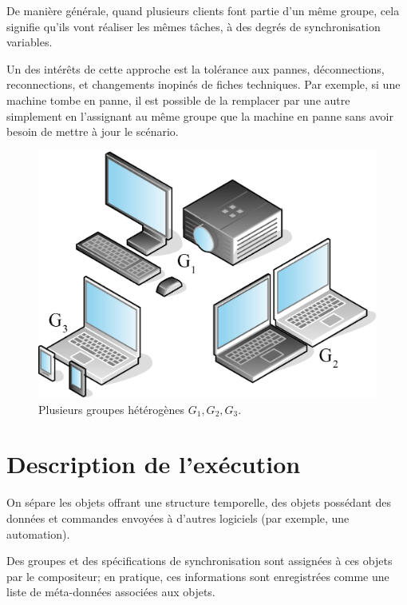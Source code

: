 \documentclass[10pt]{article}
\begin{document}
De manière générale, quand plusieurs clients font partie d'un même groupe, cela signifie qu'ils vont réaliser les mêmes tâches, à des degrés de synchronisation variables.

Un des intérêts de cette approche est la tolérance aux pannes, déconnections, reconnections, et changements inopinés de fiches techniques. 
Par exemple, si une machine tombe en panne, il est possible de la remplacer par une autre simplement en l'assignant au même groupe que la machine en panne 
sans avoir besoin de mettre à jour le scénario.

\begin{figure}[h]
	\centering
	\includegraphics[scale=0.4]{images/groupes.eps}
	\caption{Plusieurs groupes hétérogènes $G_1,G_2,G_3$.}
	\label{img.groupes}
\end{figure}
\vspace{-0.5cm}
\section{Description de l'exécution}\label{sec.description}
On sépare les objets offrant une structure temporelle, des objets possédant des données et commandes envoyées à d'autres logiciels (par exemple, une automation).

Des groupes et des spécifications de synchronisation sont assignées à ces objets par le compositeur; en pratique, ces informations sont enregistrées comme une liste de méta-données associées aux objets.
\end{document}
